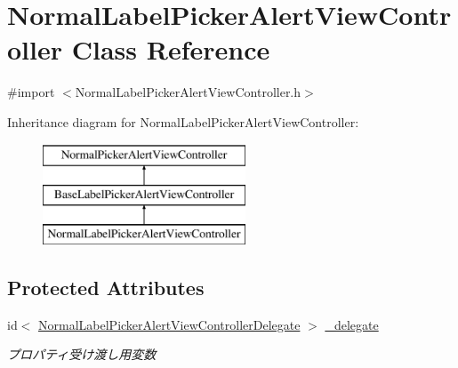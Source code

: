 \hypertarget{interface_normal_label_picker_alert_view_controller}{
\section{NormalLabelPickerAlertViewController Class Reference}
\label{interface_normal_label_picker_alert_view_controller}
}


{\ttfamily \#import $<$NormalLabelPickerAlertViewController.h$>$}

Inheritance diagram for NormalLabelPickerAlertViewController:\begin{figure}[H]
\begin{center}
\leavevmode
\includegraphics[height=3.000000cm]{interface_normal_label_picker_alert_view_controller}
\end{center}
\end{figure}
\subsection*{Protected Attributes}
\begin{DoxyCompactItemize}
\item 
\hypertarget{interface_normal_label_picker_alert_view_controller_ad7ca44076584dac0a02e0916d02516e0}{
id$<$ \hyperlink{protocol_normal_label_picker_alert_view_controller_delegate-p}{NormalLabelPickerAlertViewControllerDelegate} $>$ \hyperlink{interface_normal_label_picker_alert_view_controller_ad7ca44076584dac0a02e0916d02516e0}{\_\-delegate}}
\label{interface_normal_label_picker_alert_view_controller_ad7ca44076584dac0a02e0916d02516e0}

\begin{DoxyCompactList}\small\item\em プロパティ受け渡し用変数 \end{DoxyCompactList}\end{DoxyCompactItemize}
